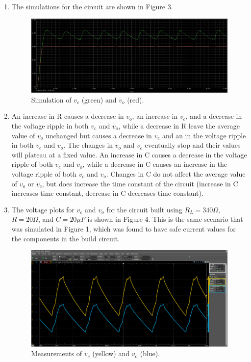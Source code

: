 \documentclass[12pt]{article}
\begin{document}
\begin{enumerate}
    \item The simulations for the circuit are shown in Figure 3.
    \begin{figure}[h!]
        \centering
        \includegraphics[width=\textwidth]{B1.png}
        \caption{Simulation of $v_c$ (green) and $v_o$ (red).}
    \end{figure}
    \item An increase in R causes a decrease in $v_o$, an increase in $v_c$, and a decrease in the voltage ripple in both $v_c$ and $v_o$, while a decrease in R leave the average value of $v_o$ unchanged but causes a decrease in $v_c$ and an in the voltage ripple in both $v_c$ and $v_o$. The changes in $v_o$ and $v_c$ eventually stop and their values will plateau at a fixed value. An increase in C causes a decrease in the voltage ripple of both $v_c$ and $v_o$, while a decrease in C causes an increase in the voltage ripple of both $v_c$ and $v_o$. Changes in C do not affect the average value of $v_o$ or $v_c$, but does increase the time constant of the circuit (increase in C increases time constant, decrease in C decreases time constant).
    \item The voltage plots for $v_c$ and $v_o$ for the circuit built using $R_L = 340\Omega$, $R=20\Omega$, and $C=20\mu F$ is shown in Figure 4. This is the same scenario that was simulated in Figure 1, which was found to have safe current values for the components in the build circuit.
    \begin{figure}[h!]
        \centering
        \includegraphics[width=\textwidth]{B2.png}
        \caption{Measurements of $v_c$ (yellow) and $v_o$ (blue).}
    \end{figure}
\end{enumerate}
\pagebreak
\end{document}
